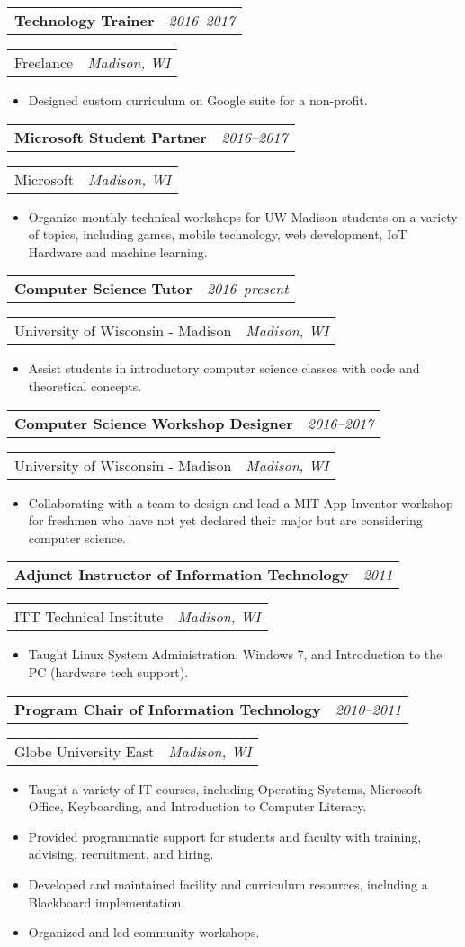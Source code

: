 \documentclass[letterpaper,11pt]{article}
\newcommand{\resitem}[1]{\item #1 \vspace{-8pt}}
\newcommand{\ressubheading}[4]{\vspace{4pt}
	\begin{tabularx}{\textwidth}{X r}
		\textbf{#1} & \textit{#4}
	\end{tabularx}

	\begin{tabularx}{\textwidth}{X r}
		#2 & \textit{#3}
	\end{tabularx}\vspace{-6pt}

}
\begin{document}
	\ressubheading{Technology Trainer}{Freelance}{Madison, WI}{2016--2017}
	\begin{itemize}
		\resitem{Designed custom curriculum on Google suite for a non-profit.}
	\end{itemize}


	\ressubheading{Microsoft Student Partner}{Microsoft}{Madison, WI}{2016--2017}
	\begin{itemize}
		\resitem{Organize monthly technical workshops for UW Madison students on a variety of topics, including games, mobile technology, web development, IoT Hardware and machine learning.}
	\end{itemize}

	\ressubheading{Computer Science Tutor}{University of Wisconsin - Madison}{Madison, WI}{2016--present}
	\begin{itemize}
		\resitem{Assist students in introductory computer science classes with code and theoretical concepts.}
	\end{itemize}

	\ressubheading{Computer Science Workshop Designer}{University of Wisconsin - Madison}{Madison, WI}{2016--2017}
	\begin{itemize}
		\resitem{Collaborating with a team to design and lead a MIT App Inventor workshop for freshmen who have not yet declared their major but are considering computer science.}
	\end{itemize}


	\ressubheading{Adjunct Instructor of Information Technology}{ITT Technical Institute}{Madison, WI}{2011}
	\begin{itemize}
		\resitem{Taught Linux System Administration, Windows 7, and Introduction to the PC (hardware tech support).}
	\end{itemize}

	\ressubheading{Program Chair of Information Technology}{Globe University East}{Madison, WI}{2010--2011}
	\begin{itemize}
		\resitem{Taught a variety of IT courses, including Operating Systems, Microsoft Office, Keyboarding, and Introduction to Computer Literacy.}
		\resitem{Provided programmatic support for students and faculty with training, advising, recruitment, and hiring.}
		\resitem{Developed and maintained facility and curriculum resources, including a Blackboard implementation.}
		\resitem{Organized and led community workshops.}
	\end{itemize}
\end{document}
